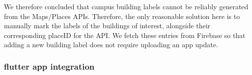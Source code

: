             We therefore concluded that campus building labels cannot be reliably generated from the Maps/Places APIs. Therefore, the only reasonable solution here is to manually mark the labels of the buildings of interest, alongside their corresponding placeID for the API. We fetch these entries from Firebase so that adding a new building label does not require uploading an app update.
        
        \subsubsection{\gls{flutter} app integration}
        
            \begin{figure}
                \begin{tabular}{@{}cc@{}}

\end{tabular}
\end{figure}
